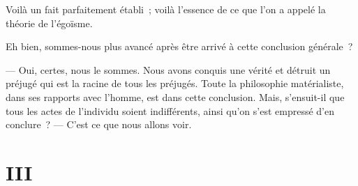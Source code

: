 \documentclass[french,twoside]{book} %
\begin{document}
Voilà un fait parfaitement établi ; voilà l’essence de ce que l’on a appelé la théorie de l’égoïsme.\par
\bigbreak
\noindent Eh bien, sommes-nous plus avancé après être arrivé à cette conclusion générale ?\par
— Oui, certes, nous le sommes. Nous avons conquis une vérité et détruit un préjugé qui est la racine de tous les préjugés. Toute la  philosophie matérialiste, dans ses rapports avec l’homme, est dans cette conclusion. Mais, s’ensuit-il que tous les actes de l’individu soient indifférents, ainsi qu’on s’est empressé d’en conclure ? — C’est ce que nous allons voir.
\section[{III}]{III}
\label{p03}\renewcommand{\leftmark}{III}
\end{document}
